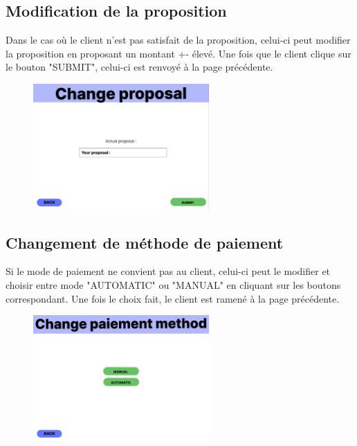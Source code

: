 \subsection{Modification de la proposition}
\begin{flushleft}
Dans le cas où le client n'est pas satisfait de la proposition, celui-ci peut modifier la proposition en proposant un montant +- élevé. Une fois que le client clique sur le bouton "SUBMIT", celui-ci est renvoyé à la page précédente.
\end{flushleft}
\begin{figure}[h]
\centering
\includegraphics[width = 0.6\textwidth]{extension-maxime/interface/img/proposal.png}
\end{figure}

\newpage
\subsection{Changement de méthode de paiement}
\begin{flushleft}
Si le mode de paiement ne convient pas au client, celui-ci peut le modifier et choisir entre mode "AUTOMATIC" ou "MANUAL" en cliquant sur les boutons correspondant. Une fois le choix fait, le client est ramené à la page précédente.
\end{flushleft}
\begin{figure}[h]
\centering
\includegraphics[width = 0.6\textwidth]{extension-maxime/interface/img/paiement-method.png}
\end{figure}

